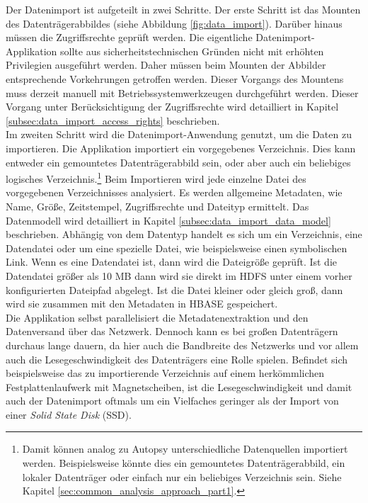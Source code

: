 \noindent
Der Datenimport ist aufgeteilt in zwei Schritte. Der erste Schritt ist das Mounten des Datenträgerabbildes (siehe Abbildung \ref{fig:data_import}). Darüber hinaus müssen die Zugriffsrechte geprüft werden. Die eigentliche Datenimport-Applikation sollte aus sicherheitstechnischen Gründen nicht mit erhöhten Privilegien ausgeführt werden. Daher müssen beim Mounten der Abbilder entsprechende Vorkehrungen getroffen werden. Dieser Vorgangs des Mountens muss derzeit manuell mit Betriebssystemwerkzeugen durchgeführt werden. Dieser Vorgang unter Berücksichtigung der Zugriffsrechte wird detailliert in Kapitel \ref{subsec:data_import_access_rights} beschrieben.\\

\noindent
Im zweiten Schritt wird die Datenimport-Anwendung genutzt, um die Daten zu importieren. 
Die Applikation importiert ein vorgegebenes Verzeichnis. Dies kann entweder ein gemountetes Datenträgerabbild sein, oder aber auch ein beliebiges logisches Verzeichnis.\footnote{Damit können analog zu Autopsy unterschiedliche Datenquellen importiert werden. Beispielsweise könnte dies ein gemountetes Datenträgerabbild, ein lokaler Datenträger oder einfach nur ein beliebiges Verzeichnis sein. Siehe Kapitel \ref{sec:common_analysis_approach_part1}.} Beim Importieren wird jede einzelne Datei des vorgegebenen Verzeichnisses analysiert. Es werden allgemeine Metadaten, wie Name, Größe, Zeitstempel, Zugriffsrechte und Dateityp ermittelt. Das Datenmodell wird detailliert in Kapitel \ref{subsec:data_import_data_model} beschrieben. Abhängig von dem Datentyp handelt es sich um ein Verzeichnis, eine Datendatei oder um eine spezielle Datei, wie beispielsweise einen symbolischen Link. Wenn es eine Datendatei ist, dann wird die Dateigröße geprüft. Ist die Datendatei größer als 10 MB dann wird sie direkt im HDFS unter einem vorher konfigurierten Dateipfad abgelegt. Ist die Datei kleiner oder gleich groß, dann wird sie zusammen mit den Metadaten in HBASE gespeichert.\\
Die Applikation selbst parallelisiert die Metadatenextraktion und den Datenversand über das Netzwerk. Dennoch kann es bei großen Datenträgern durchaus lange dauern, da hier auch die Bandbreite des Netzwerks und vor allem auch die Lesegeschwindigkeit des Datenträgers eine Rolle spielen. Befindet sich beispielsweise das zu importierende Verzeichnis auf einem herkömmlichen Festplattenlaufwerk mit Magnetscheiben, ist die Lesegeschwindigkeit und damit auch der Datenimport oftmals um ein Vielfaches geringer als der Import von einer \textit{Solid State Disk} (SSD).\\ 

